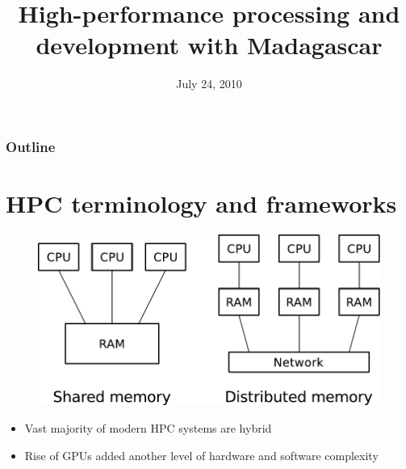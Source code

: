 \newcommand{\ccode}[4]
{
  \begin{block}{#3}
  \vspace{-5mm}
  
  \end{block}
}
%
%
\title[]{High-performance processing and development with Madagascar}

\date[Madagascar school in Houston] %
{July 24, 2010}

\begin{frame}
  \titlepage
  \appendix
\end{frame}

\begin{frame}
  \frametitle{Outline}
   \hspace*{2cm}
   \begin{minipage}[t][4.5cm]{10cm}
    \tableofcontents
   \end{minipage}
\end{frame}

\section{HPC terminology and frameworks}

\begin{frame}
  \vspace{1.0cm}
  \begin{figure}
  \includegraphics[scale=0.65]{Fig/hpc.pdf}
  \end{figure}
  \begin{block}{}
    \begin{itemize}
      \item Vast majority of modern HPC systems are hybrid
      \item Rise of GPUs added another level of hardware and software complexity
    \end{itemize}
  \end{block}
\end{frame}

